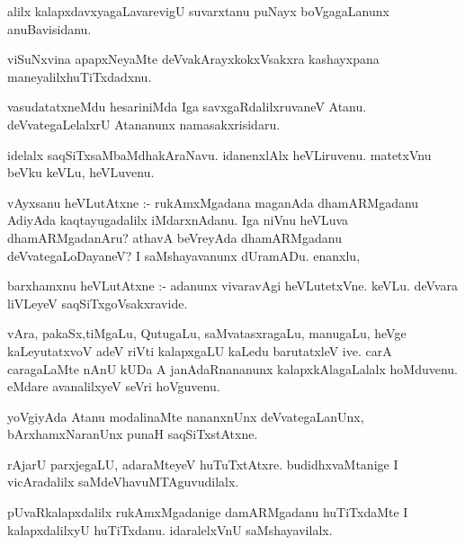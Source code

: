 \documentclass{article}
\begin{document}
\begin{mn}
alilx kalapxdavxyagaLavarevigU suvarxtanu puNayx boVgagaLanunx anuBavisidanu. 
\end{mn}

\begin{mn}
viSuNxvina apapxNeyaMte deVvakArayxkokxVsakxra kashayxpana maneyalilxhuTiTxdadxnu.
\end{mn}

\begin{mn}
vasudatatxneMdu hesariniMda Iga savxgaRdalilxruvaneV  Atanu.  deVvategaLelalxrU 
Atananunx namasakxrisidaru.
\end{mn}

\begin{mn}
idelalx saqSiTxsaMbaMdhakAraNavu.  idanenxlAlx  heVLiruvenu. matetxVnu beVku keVLu, heVLuvenu.
\end{mn}

\begin{mn}
vAyxsanu heVLutAtxne :- rukAmxMgadana maganAda dhamARMgadanu  AdiyAda kaqtayugadalilx  
iMdarxnAdanu.  Iga niVnu heVLuva dhamARMgadanAru?  athavA beVreyAda dhamARMgadanu 
deVvategaLoDayaneV?  I saMshayavanunx dUramADu.  enanxlu, 
\end{mn}

\begin{mn}
barxhamxnu heVLutAtxne :- adanunx vivaravAgi heVLutetxVne. keVLu.  deVvara 
liVLeyeV saqSiTxgoVsakxravide.
\end{mn}

\begin{mn}
vAra, pakaSx,tiMgaLu, QutugaLu, saMvatasxragaLu, manugaLu, heVge kaLeyutatxvoV 
adeV riVti kalapxgaLU kaLedu barutatxleV ive. carA caragaLaMte nAnU kUDa 
A janAdaRnananunx kalapxkAlagaLalalx  hoMduvenu. eMdare avanalilxyeV seVri hoVguvenu. 
\end{mn}

\begin{mn}
yoVgiyAda Atanu modalinaMte nananxnUnx  deVvategaLanUnx, bArxhamxNaranUnx punaH  saqSiTxstAtxne.
\end{mn}

\begin{mn}
rAjarU parxjegaLU, adaraMteyeV huTuTxtAtxre. budidhxvaMtanige I vicAradalilx saMdeVhavuMTAguvudilalx.
\end{mn}

\begin{mn}
pUvaRkalapxdalilx rukAmxMgadanige damARMgadanu huTiTxdaMte I kalapxdalilxyU 
huTiTxdanu. idaralelxVnU saMshayavilalx.
\end{mn}
\end{document}
